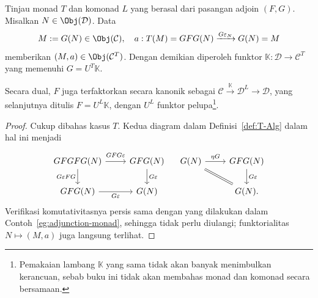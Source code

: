 
\hypertarget{o014.aljabr2.chapter7.beck-monadicity-b}{ }
\begin{lemma}\label{prop:T-comparison}
	Tinjau monad $T$ dan komonad $L$ yang berasal dari pasangan adjoin
	$(F,G)$. Misalkan $N\in\Obj(\mathcal{D})$. Data
	\[ M:=G(N)\in\Obj(\mathcal{C}), \quad
	 a:T(M)=GFG(N)\xrightarrow{G\varepsilon_N}G(N)=M \]
	memberikan $(M,a)\in\Obj(\mathcal{C}^T)$. Dengan demikian diperoleh funktor
	$\mathbb{K}:\mathcal{D}\to\mathcal{C}^T$ yang memenuhi
	$G=U^T\mathbb{K}$.

	Secara dual, $F$ juga terfaktorkan secara kanonik sebagai
	$\mathcal{C}\xrightarrow{\mathbb{K}}\mathcal{D}^L\to\mathcal{D}$, yang
	selanjutnya ditulis $F=U^L\mathbb{K}$, dengan $U^L$ funktor
	pelupa\footnote{Pemakaian lambang $\mathbb{K}$ yang sama tidak akan banyak
	menimbulkan kerancuan, sebab buku ini tidak akan membahas monad dan komonad
	secara bersamaan.}.
\end{lemma}
\begin{proof}
	Cukup dibahas kasus $T$. Kedua diagram dalam Definisi~\ref{def:T-Alg}
	dalam hal ini menjadi
	\[\begin{tikzcd}
		GFGFG(N) \arrow[r, "GFG\varepsilon" inner sep=0.5em] \arrow[d, "{G\varepsilon FG}"'] & GFG(N) \arrow[d, "G\varepsilon"] \\
		GFG(N) \arrow[r, "G\varepsilon"'] & G(N)
	\end{tikzcd} \quad \begin{tikzcd}
		G(N) \arrow[r, "\eta G"] \arrow[equal, rd] & GFG(N) \arrow[d, "{G\varepsilon}"] \\
		& G(N).
	\end{tikzcd} \]
	Verifikasi komutativitasnya persis sama dengan yang dilakukan dalam
	Contoh~\ref{eg:adjunction-monad}, sehingga tidak perlu diulangi;
	funktorialitas $N\mapsto(M,a)$ juga langsung terlihat.
\end{proof}


